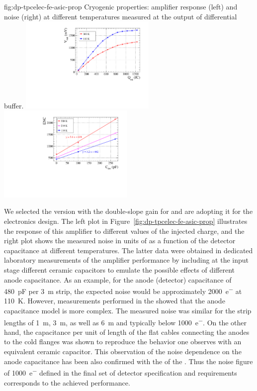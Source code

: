 \begin{dunefigure}{fig:dp-tpcelec-fe-asic-prop}
{Cryogenic   properties: amplifier response (left) and noise (right) at different temperatures measured at the output of differential buffer.}
\includegraphics[width=0.49\textwidth]{graphics/dp-tpcelec-fe-asic-gain}
\includegraphics[width=0.49\textwidth]{graphics/dp-tpcelec-fe-asic-noise}
\end{dunefigure}

We selected the  version with the double-slope gain for  and are adopting it for the   electronics design. The left plot in Figure~\ref{fig:dp-tpcelec-fe-asic-prop} illustrates the response of this amplifier to different values of the injected charge, and the right plot shows the measured noise in units of  as a function of the detector capacitance at different temperatures. The latter data were obtained in dedicated laboratory measurements of the amplifier  performance by including at the input stage different ceramic capacitors to emulate the possible effects of different anode capacitance. As an example, for the  anode (detector) capacitance of \SI{480}{\pico\farad} per \SI{3}{\metre} strip, the expected noise would be approximately \SI{2000}{e^{-}} at \SI{110}{\kelvin}. However, measurements performed in the  showed that the anode capacitance model is more complex. The measured noise was similar for the strip lengths of \SI{1}{\meter}, \SI{3}{\meter}, as well as \SI{6}{\meter} and typically below \SI{1000}{e^{-}}. On the other hand, the capacitance per unit of length of the flat cables connecting the anodes to the cold flanges was shown to reproduce the behavior one observes with an equivalent ceramic capacitor. This observation of the noise dependence on the anode capacitance has been also confirmed with the  of the . Thus the noise figure of \SI{1000}{e^{-}} defined in the final set of detector specification and requirements corresponds to the achieved performance. 

